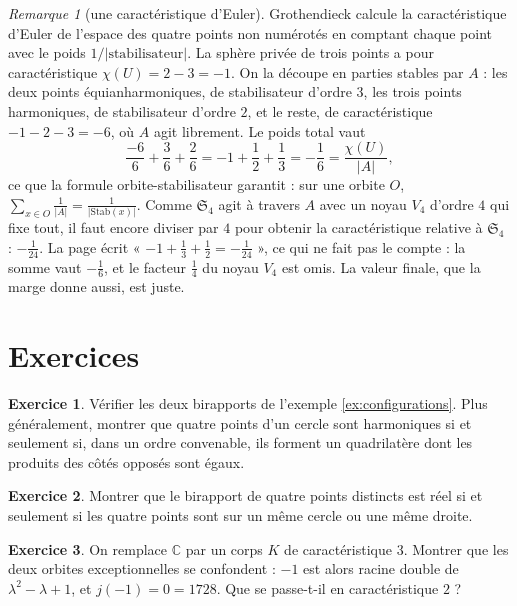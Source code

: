 \documentclass[11pt,a4paper]{article}
\theoremstyle{plain}
\theoremstyle{definition}
\newtheorem{exercice}{Exercice}
\theoremstyle{remark}
\newtheorem{remarque}[theoreme]{Remarque}
\newcommand{\C}{\mathbb{C}}
\newcommand{\Sym}{\mathfrak{S}}
\begin{document}
\begin{remarque}[une caractéristique d'Euler]\label{rem:euler}
Grothendieck calcule la caractéristique d'Euler de l'espace des quatre points non numérotés en comptant chaque point avec le poids $1/|\text{stabilisateur}|$. La sphère privée de trois points a pour caractéristique $\chi(U)=2-3=-1$. On la découpe en parties stables par $A$ : les deux points équianharmoniques, de stabilisateur d'ordre $3$, les trois points harmoniques, de stabilisateur d'ordre $2$, et le reste, de caractéristique $-1-2-3=-6$, où $A$ agit librement. Le poids total vaut
\[
  \frac{-6}6+\frac{3}{6}+\frac26=-1+\frac12+\frac13=-\frac16=\frac{\chi(U)}{|A|},
\]
ce que la formule orbite-stabilisateur garantit : sur une orbite $O$, $\sum_{x\in O}\frac1{|A|}=\frac1{|\mathrm{Stab}(x)|}$. Comme $\Sym_4$ agit à travers $A$ avec un noyau $V_4$ d'ordre $4$ qui fixe tout, il faut encore diviser par $4$ pour obtenir la caractéristique relative à $\Sym_4$ : $-\frac1{24}$. La page écrit « $-1+\frac13+\frac12=-\frac1{24}$ », ce qui ne fait pas le compte : la somme vaut $-\frac16$, et le facteur $\frac14$ du noyau $V_4$ est omis. La valeur finale, que la marge donne aussi, est juste.
\end{remarque}

\section{Exercices}

\begin{exercice}\label{exo:carre}
Vérifier les deux birapports de l'exemple \ref{ex:configurations}. Plus généralement, montrer que quatre points d'un cercle sont harmoniques si et seulement si, dans un ordre convenable, ils forment un quadrilatère dont les produits des côtés opposés sont égaux.
\end{exercice}

\begin{exercice}\label{exo:reel}
Montrer que le birapport de quatre points distincts est réel si et seulement si les quatre points sont sur un même cercle ou une même droite.
\end{exercice}

\begin{exercice}\label{exo:car3}
On remplace $\C$ par un corps $K$ de caractéristique $3$. Montrer que les deux orbites exceptionnelles se confondent : $-1$ est alors racine double de $\lambda^2-\lambda+1$, et $j(-1)=0=1728$. Que se passe-t-il en caractéristique $2$ ?
\end{exercice}
\end{document}
